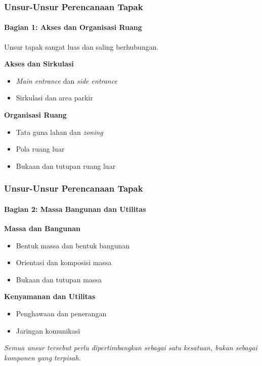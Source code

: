 \documentclass[../main.tex]{subfiles}
\begin{document}
\begin{frame}[mytitle=standard, t, mycolor=digiPH_gray, light]
	\frametitle{Unsur-Unsur Perencanaan Tapak}
	\framesubtitle{Bagian 1: Akses dan Organisasi Ruang}

	Unsur tapak sangat luas dan saling berhubungan.

	\vspace{0.3cm}
	\textbf{Akses dan Sirkulasi}
	\begin{itemize}
		\item \textit{Main entrance} dan \textit{side entrance}
		\item Sirkulasi dan area parkir
	\end{itemize}

	\vspace{0.3cm}
	\textbf{Organisasi Ruang}
	\begin{itemize}
		\item Tata guna lahan dan \textit{zoning}
		\item Pola ruang luar
		\item Bukaan dan tutupan ruang luar
	\end{itemize}
\end{frame}

\begin{frame}[mytitle=standard, t, mycolor=digiPH_cream, light]
	\frametitle{Unsur-Unsur Perencanaan Tapak}
	\framesubtitle{Bagian 2: Massa Bangunan dan Utilitas}

	\textbf{Massa dan Bangunan}
	\begin{itemize}
		\item Bentuk massa dan bentuk bangunan
		\item Orientasi dan komposisi massa
		\item Bukaan dan tutupan massa
	\end{itemize}

	\vspace{0.3cm}
	\textbf{Kenyamanan dan Utilitas}
	\begin{itemize}
		\item Penghawaan dan penerangan
		\item Jaringan komunikasi
	\end{itemize}

	\vspace{0.3cm}
	\textit{Semua unsur tersebut perlu dipertimbangkan sebagai satu kesatuan, bukan sebagai komponen yang terpisah.}
\end{frame}
\end{document}

